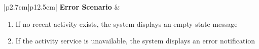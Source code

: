\begin{table}[H]
\begin{tabular}{|p{2.7cm}|p{12.5cm}|}
        \textbf{Error Scenario} & \begin{minipage}[t]{\linewidth}
                                      \begin{enumerate}[topsep=0pt,itemsep=1pt,parsep=0pt,partopsep=0pt]
                                          \item If no recent activity exists, the system displays an empty-state message
                                          \item If the activity service is unavailable, the system displays an error
                                                notification
                                      \end{enumerate}
                                  \end{minipage}                                                  \\ \hline
    \end{tabular}
    \label{tab:admin-recent-activity}
\end{table}
